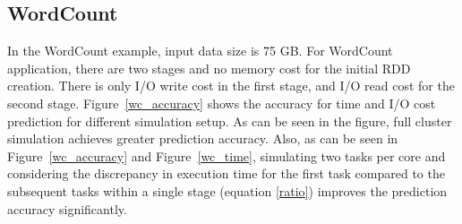 \subsection{WordCount}
\noindent
In the WordCount example, input data size is 75 GB. For WordCount application, there are two stages and no memory cost for the initial RDD creation. There is only I/O write cost in the first stage, and I/O read cost for the second stage. Figure~\ref{wc_accuracy} shows the accuracy for time and I/O cost prediction for different simulation setup. As can be seen in the figure, full cluster simulation achieves greater prediction accuracy. Also, as can be seen in Figure~\ref{wc_accuracy} and Figure~\ref{wc_time}, simulating two tasks per core and considering the discrepancy in execution time for the first task compared to the subsequent tasks within a single stage (equation \ref{ratio}) improves the prediction accuracy significantly. 
\noindent
